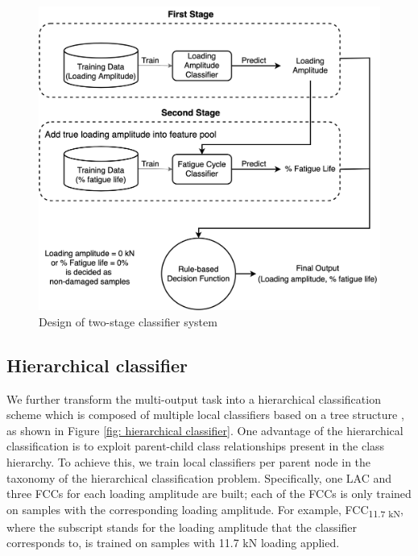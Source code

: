 \begin{figure}[tb]
    \centering
    \includegraphics[width=0.9\linewidth]{fig/two-stage_classifier.png}
    \caption{Design of two-stage classifier system}
    \label{fig: two-stage classifier}
\end{figure}

\subsection{Hierarchical classifier}
We further transform the multi-output task into a hierarchical classification scheme which is composed of multiple local classifiers based on a tree structure \cite{hierarchical-Silla2011}, as shown in Figure \ref{fig: hierarchical classifier}. One advantage of the hierarchical classification is to exploit parent-child class relationships present in the class hierarchy. To achieve this, we train local classifiers per parent node in the taxonomy of the hierarchical classification problem. Specifically, one LAC and three FCCs for each loading amplitude are built; each of the FCCs is only trained on samples with the corresponding loading amplitude. For example, FCC\textsubscript{11.7 kN}, where the subscript stands for the loading amplitude that the classifier corresponds to, is trained on samples with 11.7 kN loading applied. 

